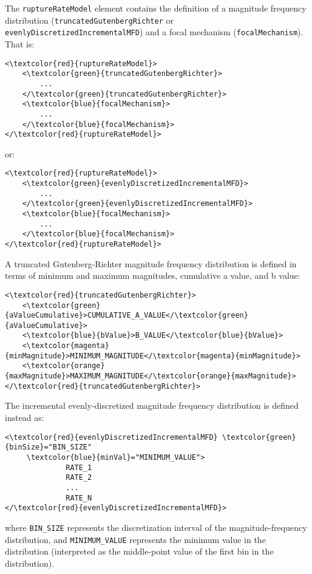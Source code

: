 The \Verb+ruptureRateModel+ element contains the definition of a magnitude frequency distribution (\Verb+truncatedGutenbergRichter+ or \Verb+evenlyDiscretizedIncrementalMFD+) and a focal mechanism (\Verb+focalMechanism+). That is:
\begin{Verbatim}[frame=single, commandchars=\\\{\},fontsize=\normalsize, samepage=true]
<\textcolor{red}{ruptureRateModel}>
	<\textcolor{green}{truncatedGutenbergRichter}>
		...
	</\textcolor{green}{truncatedGutenbergRichter}>
	<\textcolor{blue}{focalMechanism}>
		...
	</\textcolor{blue}{focalMechanism}>
</\textcolor{red}{ruptureRateModel}>
\end{Verbatim}
or:
\begin{Verbatim}[frame=single, commandchars=\\\{\},fontsize=\normalsize, samepage=true]
<\textcolor{red}{ruptureRateModel}>
	<\textcolor{green}{evenlyDiscretizedIncrementalMFD}>
		...
	</\textcolor{green}{evenlyDiscretizedIncrementalMFD}>
	<\textcolor{blue}{focalMechanism}>
		...
	</\textcolor{blue}{focalMechanism}>
</\textcolor{red}{ruptureRateModel}>
\end{Verbatim}
A truncated Gutenberg-Richter magnitude frequency distribution is defined in terms of minimum and maximum magnitudes, cumulative a value, and b value:
\begin{Verbatim}[frame=single, commandchars=\\\{\},fontsize=\normalsize, samepage=true]
<\textcolor{red}{truncatedGutenbergRichter}>
	<\textcolor{green}{aValueCumulative}>CUMULATIVE_A_VALUE</\textcolor{green}{aValueCumulative}>
	<\textcolor{blue}{bValue}>B_VALUE</\textcolor{blue}{bValue}>
	<\textcolor{magenta}{minMagnitude}>MINIMUM_MAGNITUDE</\textcolor{magenta}{minMagnitude}>
	<\textcolor{orange}{maxMagnitude}>MAXIMUM_MAGNITUDE</\textcolor{orange}{maxMagnitude}>
</\textcolor{red}{truncatedGutenbergRichter}>
\end{Verbatim}
The incremental evenly-discretized magnitude frequency distribution is defined instead as:
\begin{Verbatim}[frame=single, commandchars=\\\{\},fontsize=\normalsize, samepage=true]
<\textcolor{red}{evenlyDiscretizedIncrementalMFD} \textcolor{green}{binSize}="BIN_SIZE"
 	 \textcolor{blue}{minVal}="MINIMUM_VALUE">
              RATE_1
              RATE_2
              ...
              RATE_N
</\textcolor{red}{evenlyDiscretizedIncrementalMFD}>
\end{Verbatim}
where \Verb+BIN_SIZE+ represents the discretization interval of the magnitude-frequency distribution, and \Verb+MINIMUM_VALUE+ represents the minimum value in the distribution (interpreted as the middle-point value of the first bin in the distribution).\\
